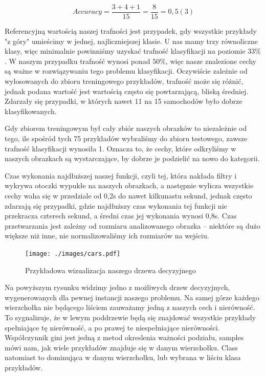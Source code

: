 \documentclass{article}
\begin{document}
\begin{equation}
Accuracy = \frac{3 + 4 + 1}{15} = \frac{8}{15} = 0,5(3)
\end{equation}

Referencyjną wartością naszej trafności jest przypadek, gdy wszystkie przykłady "z góry" umieścimy w jednej, najliczniejszej klasie. U nas mamy trzy równoliczne klasy, więc minimalnie powinniśmy uzyskać trafność klasyfikacji na poziomie $33\%$. W naszym przypadku trafność wynosi ponad $50\%$, więc nasze znalezione cechy są ważne w rozwiązywaniu tego problemu klasyfikacji. Oczywiście zależnie od wylosowanych do zbioru treningowego przykładów, trafność może się różnić, jednak podana wartość jest wartością często się powtarzającą, bliską średniej. Zdarzały się przypadki, w których nawet 11 na 15 samochodów było dobrze klasyfikowanych. 

Gdy zbiorem treningowym był cały zbiór naszych obrazków to niezależnie od tego, ile spośród tych 75 przykładów wybraliśmy do zbioru testowego, zawsze trafność klasyfikacji wynosiła 1. Oznacza to, że cechy, które odkryliśmy w naszych obrazkach są wystarczające, by dobrze je podzielić na nowo do kategorii.

Czas wykonania najdłuższej naszej funkcji, czyli tej, która nakłada filtry i wykrywa otoczki wypukłe na naszych obrazkach, a następnie wylicza wszystkie cechy waha się w przedziale od 0,2s do nawet kilkunastu sekund, jednak często zdarzają się przypadki, gdzie najdłuższy czas wykonania tej funkcji nie przekracza czterech sekund, a średni czas jej wykonania wynosi 0,8s. Czas przetwarzania jest zależny od rozmiaru analizowanego obrazka -- niektóre są dużo większe niż inne, nie normalizowaliśmy ich rozmiarów na wejściu.

\begin{figure}[H]
\begin{center}
\texttt{[image: ./images/cars.pdf]}
\end{center}
\caption{Przykładowa wizualizacja naszego drzewa decyzyjnego}
\label{fig: wykres3}
\end{figure}

Na powyższym rysunku widzimy jedno z możliwych drzew decyzyjnych, wygenerowanych dla pewnej instancji naszego problemu. Na samej górze każdego wierzchołka nie będącego liściem zauważamy jedną z naszych cech i nierówność. To sygnalizuje, że w lewym poddrzewie będą się znajdować wszystkie przykłady spełniające tę nierówność, a po prawej te niespełniające nierówności. Współczynnik gini jest jedną z metod okreslenia ważności podziału, samples mówi nam, jak wiele przykładów znajduje się w danym wierzchołku. Class natomiast to dominująca w danym wierzchołku, lub wybrana w liściu klasa przykładów.
\end{document}
